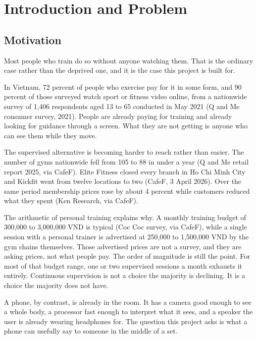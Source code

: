 \chapter{Introduction and Problem}
\label{chap:1}

\section{Motivation}
\label{sec:1.1}

Most people who train do so without anyone watching them. That is the ordinary case rather than the deprived one, and it is the case this project is built for.

In Vietnam, 72 percent of people who exercise pay for it in some form, and 90 percent of those surveyed watch sport or fitness video online, from a nationwide survey of 1,406 respondents aged 13 to 65 conducted in May 2021 (Q and Me consumer survey, 2021)\cite{qandme2021fitness}. People are already paying for training and already looking for guidance through a screen. What they are not getting is anyone who can see them while they move.

The supervised alternative is becoming harder to reach rather than easier. The number of gyms nationwide fell from 105 to 88 in under a year (Q and Me retail report 2025, via CafeF)\cite{qandme2025retail}. Elite Fitness closed every branch in Ho Chi Minh City and Kickfit went from twelve locations to two (CafeF, 3 April 2026)\cite{cafef2026gyms}. Over the same period membership prices rose by about 4 percent while customers reduced what they spent (Ken Research, via CafeF)\cite{kenresearch2025membership}.

The arithmetic of personal training explains why. A monthly training budget of 300,000 to 3,000,000 VND is typical (Coc Coc survey, via CafeF)\cite{coccoc2025budget}, while a single session with a personal trainer is advertised at 250,000 to 1,500,000 VND by the gym chains themselves. Those advertised prices are not a survey, and they are asking prices, not what people pay. The order of magnitude is still the point. For most of that budget range, one or two supervised sessions a month exhausts it entirely. Continuous supervision is not a choice the majority is declining. It is a choice the majority does not have.

A phone, by contrast, is already in the room. It has a camera good enough to see a whole body, a processor fast enough to interpret what it sees, and a speaker the user is already wearing headphones for. The question this project asks is what a phone can usefully say to someone in the middle of a set.

